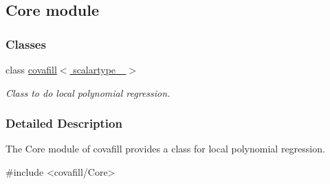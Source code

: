 \hypertarget{group__core}{}\subsection{Core module}
\label{group__core}
\subsubsection*{Classes}
\begin{DoxyCompactItemize}
\item 
class \hyperlink{classcovafill}{covafill$<$ scalartype\+\_\+ $>$}
\begin{DoxyCompactList}\small\item\em Class to do local polynomial regression. \end{DoxyCompactList}\end{DoxyCompactItemize}


\subsubsection{Detailed Description}
The Core module of covafill provides a class for local polynomial regression. \begin{DoxyVerb}#include <covafill/Core>
\end{DoxyVerb}
 